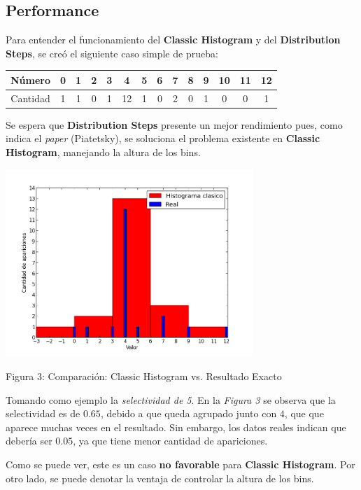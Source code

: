 \documentclass[10pt, a4paper,english,spanish,hidelinks]{article}
\begin{document}
\subsection{Performance}
Para entender el funcionamiento del \textbf{Classic Histogram} y del \textbf{Distribution Steps}, se creó el siguiente caso simple de prueba:

\begin{table}[htdp]
  \begin{center}
    \begin{tabular}{|c|c|c|c|c|c|c|c|c|c|c|c|c|c|} \hline
       Número  & 0 & 1 & 2 & 3 & 4 & 5 & 6 & 7 & 8 & 9 & 10 & 11 & 12 \\ \hline
       Cantidad & 1 & 1 & 0 & 1 & 12 & 1 & 0 & 2 & 0 & 1 & 0 & 0 & 1 \\ \hline
    \end{tabular}
  \end{center}
\end{table}


Se espera que \textbf{Distribution Steps} presente un mejor rendimiento pues, como indica el \textit{paper} (Piatetsky),
se soluciona el problema existente en \textbf{Classic Histogram}, manejando la altura
de los bins.


\centerline{  \includegraphics[width=0.7\textwidth]{./imagenes/ejb1_ejemplo_classic_y_real.png}}
\centerline{ Figura 3: Comparación: Classic Histogram vs. Resultado Exacto}


Tomando como ejemplo la \textit{selectividad de 5}.
En la \textit{Figura 3} se observa que la selectividad es de $0.65$, debido a que queda agrupado junto
con $4$, que que aparece muchas veces en el resultado. Sin embargo, los datos reales indican que debería ser $0.05$, ya que tiene menor cantidad de apariciones.

Como se puede ver, este es un caso \textbf{no favorable} para \textbf{Classic Histogram}. Por otro lado, se puede denotar la ventaja de controlar la altura de los bins.
\end{document}
